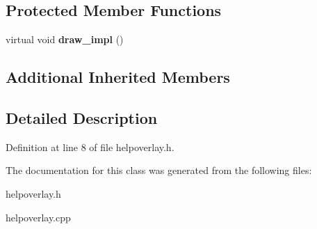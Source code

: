 \subsection*{Protected Member Functions}
\begin{DoxyCompactItemize}
\item 
virtual void {\bfseries draw\-\_\-impl} ()\label{classSoundfieldViewer_1_1HelpOverlay_a3bd3018bfdca50e84621f720268c7cf4}

\end{DoxyCompactItemize}
\subsection*{Additional Inherited Members}


\subsection{Detailed Description}


Definition at line 8 of file helpoverlay.\-h.



The documentation for this class was generated from the following files\-:\begin{DoxyCompactItemize}
\item 
helpoverlay.\-h\item 
helpoverlay.\-cpp\end{DoxyCompactItemize}
